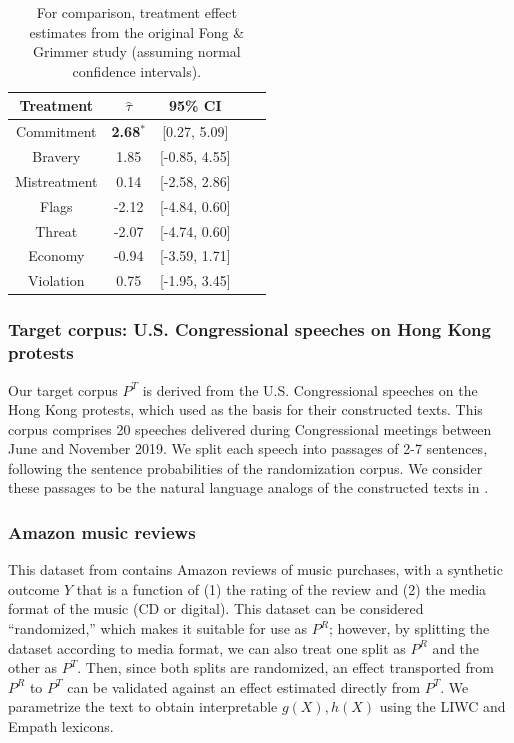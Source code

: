 \documentclass{article}
\begin{document}
\begin{table}[!ht]
    \centering
    \begin{tabular}{c|cccc}
        \toprule
        Treatment & $\hat{\tau}$ & 95\% CI \\
        \midrule
        Commitment & \textbf{\textcolor{green!50!black}{2.68$^*$}} & [0.27, 5.09] \\
        Bravery & \textcolor{green!50!black}{1.85} & [-0.85, 4.55] \\
        Mistreatment & \textcolor{green!50!black}{0.14} & [-2.58, 2.86] \\
        Flags & \textcolor{red!80!black}{-2.12} & [-4.84, 0.60] \\
        Threat & \textcolor{red!80!black}{-2.07} & [-4.74, 0.60]  \\
        Economy & \textcolor{red!80!black}{-0.94} & [-3.59, 1.71] \\
        Violation & \textcolor{green!50!black}{0.75} & [-1.95, 3.45] \\
        \bottomrule
    \end{tabular}
    \caption{For comparison, treatment effect estimates from the original Fong \& Grimmer study \cite{fong2021causal} (assuming normal confidence intervals).}
    \label{tab:results_baseline}
\end{table}

\subsubsection{Target corpus: U.S. Congressional speeches on Hong Kong protests}

Our target corpus $P^T$ is derived from the U.S. Congressional speeches on the Hong Kong protests, which \cite{fong2021causal} used as the basis for their constructed texts. This corpus comprises 20 speeches delivered during Congressional meetings between June and November 2019. We split each speech into passages of 2-7 sentences, following the sentence probabilities of the randomization corpus. We consider these passages to be the natural language analogs of the constructed texts in \cite{fong2021causal}.

\subsubsection{Amazon music reviews}

This dataset from \cite{przyant2021causal} contains Amazon reviews of music purchases, with a synthetic outcome $Y$ that is a function of (1) the rating of the review and (2) the media format of the music (CD or digital). This dataset can be considered ``randomized,'' which makes it suitable for use as $P^R$; however, by splitting the dataset according to media format, we can also treat one split as $P^R$ and the other as $P^T$. Then, since both splits are randomized, an effect transported from $P^R$ to $P^T$ can be validated against an effect estimated directly from $P^T$. We parametrize the text to obtain interpretable $g(X), h(X)$ using the LIWC and Empath lexicons.
\end{document}
